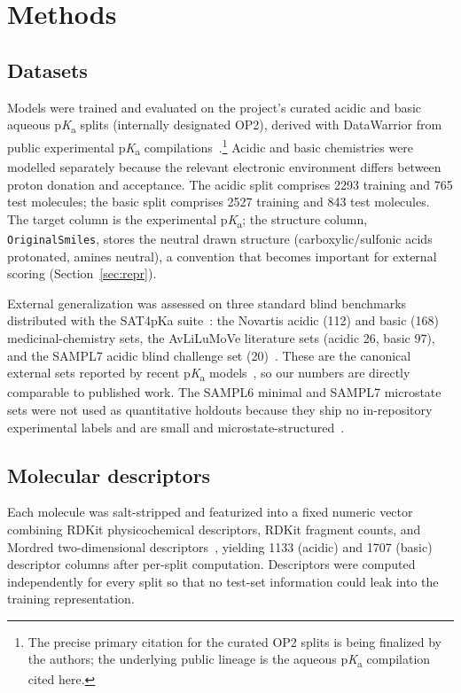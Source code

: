 \documentclass[11pt]{article}
\newcommand{\pka}{p\textit{K}\textsubscript{a}}
\begin{document}
\section{Methods}

\subsection{Datasets}

Models were trained and evaluated on the project's curated acidic and basic aqueous \pka{}
splits (internally designated OP2), derived with DataWarrior from public experimental \pka{}
compilations~\cite{iupac_pka_dataset}.\footnote{The precise primary citation for the curated
OP2 splits is being finalized by the authors; the underlying public lineage is the aqueous
\pka{} compilation cited here.} Acidic and basic chemistries were modelled separately because
the relevant electronic environment differs between proton donation and acceptance. The
acidic split comprises 2293 training and 765 test molecules; the basic split comprises 2527
training and 843 test molecules. The target column is the experimental \pka{}; the structure
column, \texttt{OriginalSmiles}, stores the neutral drawn structure (carboxylic/sulfonic acids
protonated, amines neutral), a convention that becomes important for external scoring
(Section~\ref{sec:repr}).

External generalization was assessed on three standard blind benchmarks distributed with the
SAT4pKa suite~\cite{qiu2024sat4pka}: the Novartis acidic (112) and basic (168) medicinal-chemistry
sets, the AvLiLuMoVe literature sets (acidic 26, basic 97), and the SAMPL7 acidic blind
challenge set (20)~\cite{bergazin2021sampl7}. These are the canonical external sets reported by
recent \pka{} models~\cite{abarbanel2024qupkake,qiu2024sat4pka}, so our numbers are directly
comparable to published work. The SAMPL6 minimal and SAMPL7 microstate sets were not used as
quantitative holdouts because they ship no in-repository experimental labels and are small and
microstate-structured~\cite{isik2021sampl6pka}.

\subsection{Molecular descriptors}

Each molecule was salt-stripped and featurized into a fixed numeric vector combining RDKit
physicochemical descriptors, RDKit fragment counts, and Mordred two-dimensional
descriptors~\cite{rdkit,moriwaki2018mordred}, yielding 1133 (acidic) and 1707 (basic) descriptor
columns after per-split computation. Descriptors were computed independently for every split so
that no test-set information could leak into the training representation.
\end{document}

